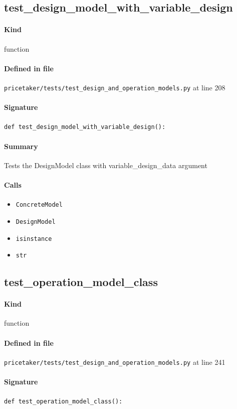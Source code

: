\documentclass[11pt]{report}
\begin{document}
\subsection{test\_design\_model\_with\_variable\_design}
\label{def:pricetaker-tests-test_design_and_operation_models.py:test_design_model_with_variable_design:L208}
\paragraph{Kind} function
\paragraph{Defined in file} \texttt{pricetaker/tests/test\_design\_and\_operation\_models.py} at line 208
\paragraph{Signature} \texttt{def test\_design\_model\_with\_variable\_design():}
\paragraph{Summary} Tests the DesignModel class with variable\_design\_data argument
\paragraph{Calls}
\begin{itemize}[leftmargin=*]
  \item \texttt{ConcreteModel}
  \item \texttt{DesignModel}
  \item \texttt{isinstance}
  \item \texttt{str}
\end{itemize}
\subsection{test\_operation\_model\_class}
\label{def:pricetaker-tests-test_design_and_operation_models.py:test_operation_model_class:L241}
\paragraph{Kind} function
\paragraph{Defined in file} \texttt{pricetaker/tests/test\_design\_and\_operation\_models.py} at line 241
\paragraph{Signature} \texttt{def test\_operation\_model\_class():}
\end{document}
